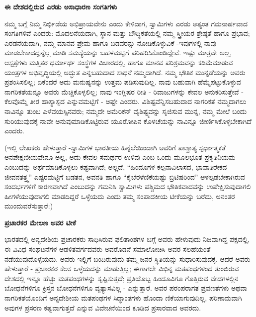 \begin{center}
\textbf{ಈ ದೇಶದಲ್ಲಿರುವ ಎರಡು ಅಸಾಧಾರಣ ಸಂಗತಿಗಳು}
\end{center}

ನಮ್ಮ ಬಗ್ಗೆ ನಿಮ್ಮ ನಿರ್ಭಿಡೆಯ ಅಭಿಪ್ರಾಯವೇನು ಎಂದು ಕೇಳಿದಾಗ, ಸ್ವಾಮಿಗಳು ಎರಡು ಅತ್ಯಂತ ಗಮನಾರ್ಹವಾದ ಸಂಗತಿಗಳಿವೆ ಎಂದರು: ಮೊದಲನೆಯದಾಗಿ, ಸ್ಥಾನ ಮತ್ತು ಬೌದ್ಧಿಕತೆಯಲ್ಲಿ ನಮ್ಮ ಸ್ತ್ರೀಯರ ಶ್ರೇಷ್ಠತೆ ಹಾಗೂ ಪ್ರಭಾವ; ಎರಡನೆಯದಾಗಿ, ನಮ್ಮ ಮಾನವ ಪ್ರೇಮ ಹಾಗೂ ಬಡವರನ್ನು ನೋಡಿಕೊಳ್ಳುವಿಕೆ -ಇವುಗಳಲ್ಲಿ ನಾವು ಮಾಡಬೇಕಾದದ್ದನ್ನೆಲ್ಲ ಮಾಡಿ ಸಮಸ್ಯೆಯನ್ನು ಬಹಳಮಟ್ಟಿಗೆ ಪರಿಹರಿಸಿಕೊಂಡಿದ್ದೇವೆ. ಇಷ್ಟು ಮಾತ್ರವೇ ಅಲ್ಲ, ಆಸ್ಪತ್ರೆಗಳು ಮತ್ತಿತರ ಧರ್ಮಾರ್ಥ ಸಂಸ್ಥೆಗಳ ವಿಚಾರದಲ್ಲಿ, ಹಾಗೂ ಮಾನವ ಪರಿಶ್ರಮವನ್ನು ಕಡಿಮೆಮಾಡುವ ಯಂತ್ರಗಳ ಅಭಿವೃದ್ಧಿಯಲ್ಲಿ ಅದ್ಭುತ ಎನ್ನಬಹುದಾದ ಸಾಧನೆ ನಮ್ಮದಾಗಿದೆ. ನಮ್ಮ ಭೌತಿಕ ಮುನ್ನಡೆಯನ್ನು ಅವರು ಪ್ರಶಂಸಿಸಲಿಲ್ಲ; ಏಕೆಂದರೆ ಅದು ಮನುಷ್ಯನನ್ನು ಉತ್ತಮ ಪಡಿಸುವುದಿಲ್ಲ. ನಾವು ಬಹುವಾಗಿ ಹೆಮ್ಮೆಪಟ್ಟುಕೊಳ್ಳುವ ನಾಗರಿಕತೆಯನ್ನೂ ಅವರು ಮೆಚ್ಚಿಕೊಳ್ಳಲಿಲ್ಲ; ನಾವು ಇಂಗ್ಲಿಷರ ರೀತಿ - ರಿವಾಜುಗಳನ್ನು ಕೇವಲ ಅನುಕರಿಸುತ್ತೇವೆ - ಕೆಲವೊಮ್ಮೆ ತೀರ ಹಾಸ್ಯಾಸ್ಪದ ಎನ್ನುವಮಟ್ಟಿಗೆ - ಅಷ್ಟೇ ಎಂದರು. ವಿಶಿಷ್ಟವೆನ್ನಿಸಬಹುದಾದ ನಾಗರಿಕತೆ ನಮ್ಮದಾಗಲು ನಾವಿನ್ನೂ ತುಂಬ ಎಳೆವಯಸ್ಸಿನವರು; ನಮ್ಮದೇ ಅಮೆರಿಕನ್ ವೈಶಿಷ್ಟ್ಯವನ್ನು ಸೃಜಿಸುವ ಮುನ್ನ, ನಮ್ಮ ಮೇಲೆ ಬಂದು ಸುರಿಯುವುದಕ್ಕೆ ನಾವೇ ಅನುವುಮಾಡಿಕೊಟ್ಟಿರುವ ಯೂರೋಪಿನ ಕೊಳಚೆಯನ್ನು ನಾವಿನ್ನೂ ಜೀರ್ಣಿಸಿಕೊಳ್ಳಬೇಕಾಗಿದೆ ಎಂದರು.

(ಇಲ್ಲಿ ಲೇಖಕರು ಹೇಳುತ್ತಾರೆ -ಸ್ವಾಮಿಗಳ ಭಾರತೀಯ ಹಿನ್ನೆಲೆಯಿಂದಾಗಿ ಅವರಿಗೆ ಪಾಶ್ಚಾತ್ಯ ಸ್ಪರ್ಧಾತ್ಮಕತೆ ಅನಪೇಕ್ಷಣೀಯವೇನೂ ಅಲ್ಲ, ಅದು ಕೇವಲ ಸಮರ್ಥರ ಉಳಿವು ಎಂಬ ಒಂದು ಮೂಲಭೂತ ಪ್ರಕೃತಿನಿಯಮ ಎಂಬುದನ್ನು ಅರ್ಥಮಾಡಿಕೊಳ್ಳಲು ಕಷ್ಟವಾಗಿದೆ; ಅಲ್ಲದೆ, “ಹಿಂದೂಗಳ ಕಲ್ಪನಾವಿಲಾಸದ, ಭಾವಾತಿರೇಕದ ಜೀವನತತ್ತ್ವ” ಎಷ್ಟರಮಟ್ಟಿಗೆ ಬಡತನ, ಅವನತಿ ಹಾಗೂ “ಕೈಬೆರಳೆಣಿಕೆಯಷ್ಟು ಬ್ರಿಟಿಷರಿಂದ” ಆಳಲ್ಪಡಬೇಕಾಗಿರುವ ಸಂದರ್ಭಗಳಿಗೆ ಕಾರಣವಾಗಿದೆ ಎಂಬುದನ್ನು ಗಮನಿಸಿ ಸ್ವಾಮಿಗಳು ಪಶ್ಚಿಮದ ಭೌತಿಕವಾದವನ್ನು ಉಪೇಕ್ಷಿಸುವುದಾಗಲಿ ಹೀಗಳೆಯುವುದಾಗಲಿ ಮಾಡದಿದ್ದರೆ ಒಳ್ಳೆಯದು ಎಂದು ತಮ್ಮ ಸಂಪಾದಕೀಯ ಟೀಕೆಯನ್ನು ಬರೆದು, ಅನಂತರ ಮುಂದುವರೆಸುತ್ತಾರೆ:)

\begin{center}
\textbf{ಪ್ರಚಾರಕರ ಮೇಲಣ ಅವರ ಟೀಕೆ}
\end{center}

ಭಾರತದಲ್ಲಿ ಅನ್ಯದೇಶಿಯ ಪ್ರಚಾರಕರು ಸಾಧಿಸಿರುವ ಫಲಿತಾಂಶಗಳ ಬಗ್ಗೆ ಅವರು ಹೇಳುವುದು ನಿಜವಾಗಿದ್ದ ಪಕ್ಷದಲ್ಲಿ, ಈ ವಿವಿಧ ಸಂಘಟನೆಗಳ ಆಡಳಿತವರ್ಗದವರು ಅವರೊಡನೆ ಸಮಾಲೋಚಿಸಿ ಅವರ ಸಲಹೆಯಂತೆ ನಡೆಯುವುದೊಳ್ಳೆಯದು. ಅವರು ಇಲ್ಲಿಗೆ ಬಂದಿರುವುದು ತಮ್ಮ ಜನರ ಸ್ಥಿತಿಯನ್ನು ಸುಧಾರಿಸುವುದಕ್ಕೆ. ಆದರೆ ಅವರು ಹೇಳುತ್ತಾರೆ - ಪ್ರಚಾರಕರ ಕೆಲಸ ಒಳ್ಳೆಯದನ್ನು ಮಾಡುತ್ತಿಲ್ಲ; ಈಗಾಗಲೇ ವಿಭಿನ್ನ ಮತಪಂಥಗಳಿಂದ ತುಂಬಿರುವ ದೇಶದಲ್ಲಿ ಇನ್ನೂ ಹೆಚ್ಚು ಮತಪಂಥಗಳನ್ನು ಸೃಷ್ಟಿಸುತ್ತದೆ; ಪ್ರತಿಯೊಬ್ಬ ಹಿಂದೂವಿಗೂ ಗೊತ್ತಿರುವ ವೇದಗಳಲ್ಲಿನ ಬೋಧನೆಗಳಿಗೂ ಕ್ರಿಸ್ತನ ಬೋಧನೆಗಳಿಗೂ ವ್ಯತ್ಯಾಸವಿಲ್ಲ - ಎನ್ನುತ್ತಾರೆ. ಅವರ ಪರಂಪರಾಗತ ಪ್ರವಣತೆಗಳು ಅಥವಾ ನಾಗರಿಕತೆಯೊಂದಿಗೆ ಅನ್ಯದೇಶೀಯ ಮತಪಂಥಗಳ ಸಿದ್ಧಾಂತಗಳು ಹೊಂದಾ ಣಿಕೆಯಾಗುವುದಿಲ್ಲ, ಪರಿಣಾಮವಾಗಿ ಅವುಗಳ ಪ್ರಸರಣ ಕಷ್ಟವಾಗುತ್ತದೆ ಎನ್ನುವ ವಿವೇಚನೆಯಿಂದ ಕೂಡಿದ ಪ್ರಸಾರವಾದ ಅವರದು.


